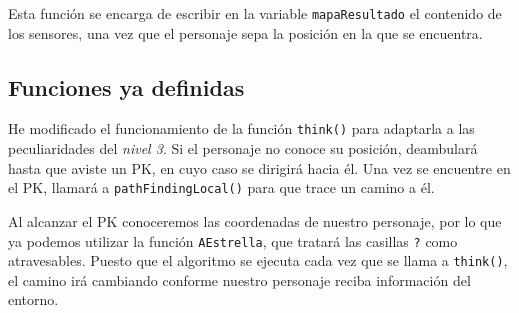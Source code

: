 \documentclass[11pt,a4paper]{article}
\begin{document}
Esta función se encarga de escribir en la variable \texttt{mapaResultado} el contenido de los sensores, una vez que el personaje sepa la posición en la que se encuentra.

\subsection*{Funciones ya definidas}

He modificado el funcionamiento de la función \texttt{think()} para adaptarla a las peculiaridades del \textit{nivel 3}.  Si el personaje no conoce su posición, deambulará hasta que aviste un PK, en cuyo caso se dirigirá hacia él. Una vez se encuentre en el PK, llamará a \texttt{pathFindingLocal()} para que trace un camino a él.

Al alcanzar el PK conoceremos las coordenadas de nuestro personaje, por lo que ya podemos utilizar la función \texttt{AEstrella}, que tratará las casillas \texttt{?} como atravesables. Puesto que el algoritmo se ejecuta cada vez que se llama a \texttt{think()}, el camino irá cambiando conforme nuestro personaje reciba información del entorno.   
\end{document}
